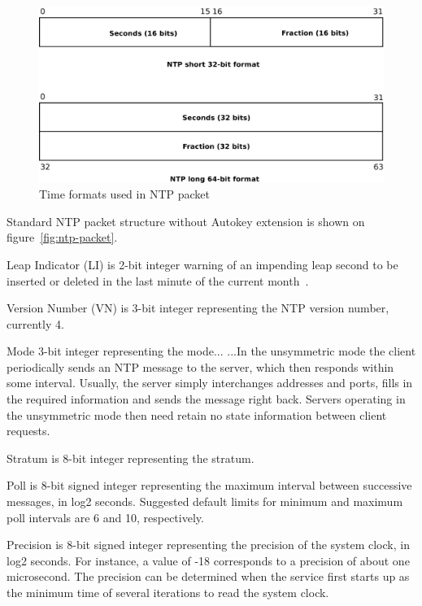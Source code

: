 \begin{figure}
	\centering
	\includegraphics[width=13cm,keepaspectratio]{fig/ntp-timestamps.pdf}
	\caption{Time formats used in NTP packet}
	\label{fig:ntp-timestamps}
	\bigskip
\end{figure}

Standard NTP packet structure without Autokey extension is shown on figure~\ref{fig:ntp-packet}.

Leap Indicator (LI) is 2-bit integer warning of an impending leap
second to be inserted or deleted in the last minute of the current
month~\cite{rfc5905}.

Version Number (VN) is 3-bit integer representing the NTP
version number, currently 4.

Mode 3-bit integer representing the mode...
...In the unsymmetric mode the
      client periodically sends an NTP message to the server, which then
      responds within some interval.  Usually, the server simply
      interchanges addresses and ports, fills in the required
      information and sends the message right back. Servers operating in
      the unsymmetric mode then need retain no state information between
      client requests.

Stratum is 8-bit integer representing the stratum.

Poll is 8-bit signed integer representing the maximum interval between
successive messages, in log2 seconds.
Suggested default limits for minimum and maximum poll intervals are 6 and 10, respectively.

Precision is 8-bit signed integer representing the precision of the
system clock, in log2 seconds.
For instance, a value of -18
corresponds to a precision of about one microsecond. %
The precision
can be determined when the service first starts up as the minimum
time of several iterations to read the system clock.
   
